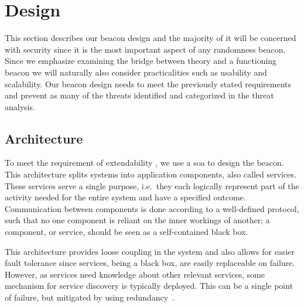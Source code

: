 \section{Design}\label{sec:design}

This section describes our beacon design and the majority of it will be concerned with security since it is the most important aspect of any randomness beacon. Since we emphasize examining the bridge between theory and a functioning beacon we will naturally also consider practicalities such as usability and scalability.
Our beacon design needs to meet the previously stated requirements and prevent as many of the threats identified and categorized in the threat analysis.

\subsection{Architecture}\label{sec:design_architecture}
To meet the requirement of extendability , we use a \gls{soa} to design the beacon.
This architecture splits systems into application components, also called services.
These services serve a single purpose, i.e.\ they each logically represent part of the activity needed for the entire system and have a specified outcome.
Communication between components is done according to a well-defined protocol, such that no one component is reliant on the inner workings of another;
a component, or service, should be seen as a self-contained black box.

This architecture provides loose coupling in the system and also allows for easier fault tolerance since services, being a black box, are easily replaceable on failure.
However, as services need knowledge about other relevant services, some mechanism for service discovery is typically deployed.
This can be a single point of failure, but mitigated by using redundancy~\cite{soa_redundancy}.
